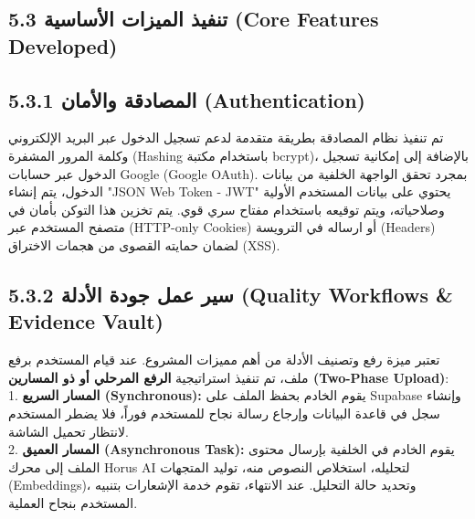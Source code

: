 \documentclass[12pt, a4paper]{report}
\begin{document}
\begin{english}
\section*{5.3 تنفيذ الميزات الأساسية (Core Features Developed)}

\subsection*{5.3.1 المصادقة والأمان (Authentication)}
تم تنفيذ نظام المصادقة بطريقة متقدمة لدعم تسجيل الدخول عبر البريد الإلكتروني وكلمة المرور المشفرة (Hashing باستخدام مكتبة bcrypt)، بالإضافة إلى إمكانية تسجيل الدخول عبر حسابات Google (Google OAuth). بمجرد تحقق الواجهة الخلفية من بيانات الدخول، يتم إنشاء "JSON Web Token - JWT" يحتوي على بيانات المستخدم الأولية وصلاحياته، ويتم توقيعه باستخدام مفتاح سري قوي. يتم تخزين هذا التوكن بأمان في متصفح المستخدم عبر (HTTP-only Cookies) أو ارساله في الترويسة (Headers) لضمان حمايته القصوى من هجمات الاختراق (XSS). \\

\subsection*{5.3.2 سير عمل جودة الأدلة (Quality Workflows & Evidence Vault)}
تعتبر ميزة رفع وتصنيف الأدلة من أهم مميزات المشروع. عند قيام المستخدم برفع ملف، تم تنفيذ استراتيجية \textbf{الرفع المرحلي أو ذو المسارين (Two-Phase Upload)}: \\
1. \textbf{المسار السريع (Synchronous):} يقوم الخادم بحفظ الملف على Supabase وإنشاء سجل في قاعدة البيانات وإرجاع رسالة نجاح للمستخدم فوراً، فلا يضطر المستخدم لانتظار تحميل الشاشة. \\
2. \textbf{المسار العميق (Asynchronous Task):} يقوم الخادم في الخلفية بإرسال محتوى الملف إلى محرك Horus AI لتحليله، استخلاص النصوص منه، توليد المتجهات (Embeddings)، وتحديد حالة التحليل. عند الانتهاء، تقوم خدمة الإشعارات بتنبيه المستخدم بنجاح العملية. \\


\end{english}
\end{document}
